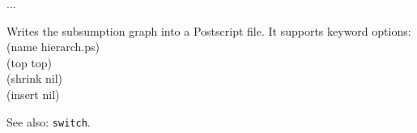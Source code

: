  ...

Writes the subsumption graph into a Postscript file. It supports keyword
options:\\
(name hierarch.ps)\\
(top top)\\
(shrink nil)\\
(insert nil)

See also: {\tt switch}.

